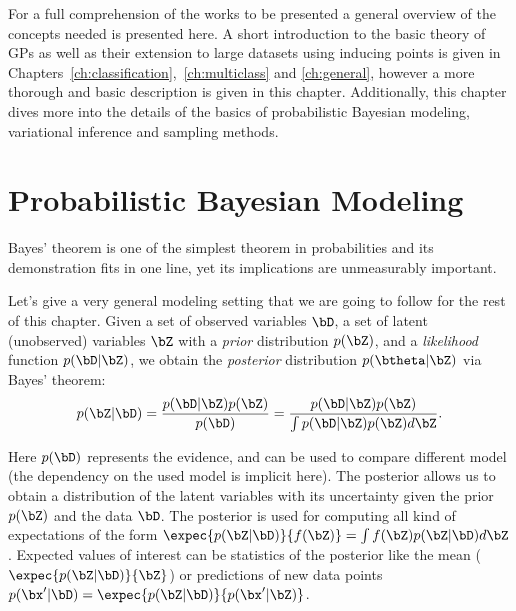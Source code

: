 


\graphicspath{{2_background/figures/}}

For a full comprehension of the works to be presented a general overview of the concepts needed is presented here.
A short introduction to the basic theory of \acl{GPs} as well as their extension to large datasets using inducing points \cite{Titsias2009} is given in Chapters~\ref{ch:classification},~\ref{ch:multiclass} and \ref{ch:general}, however a more thorough and basic description is given in this chapter.
Additionally, this chapter dives more into the details of the basics of probabilistic Bayesian modeling, variational inference and sampling methods.


\section{Probabilistic Bayesian Modeling}

\label{sec:prob_bayes}

Bayes' theorem is one of the simplest theorem in probabilities and its demonstration fits in one line, yet its implications are unmeasurably important.

Let's give a very general modeling setting that we are going to follow for the rest of this chapter.
Given a set of observed variables $\bD$, a set of latent (unobserved) variables $\bZ$ with a \textit{prior} distribution $p(\bZ)$, and a \textit{likelihood} function $p(\bD|\bZ)$, we obtain the \textit{posterior} distribution $p(\btheta|\bZ)$ via Bayes' theorem:
\begin{align}
p(\bZ|\bD) = \frac{p(\bD|\bZ)p(\bZ)}{p(\bD)} = \frac{p(\bD|\bZ)p(\bZ)}{\int p(\bD|\bZ)p(\bZ)d\bZ}.
\label{eq:bayes}
\end{align}

Here $p(\bD)$ represents the evidence, and can be used to compare different model (the dependency on the used model is implicit here).
The posterior allows us to obtain a distribution of the latent variables with its uncertainty given the prior $p(\bZ)$ and the data $\bD$.
The posterior is used for computing all kind of expectations of the form $\expec{p(\bZ|\bD)}{f(\bZ)} = \int f(\bZ)p(\bZ|\bD)d\bZ$.
Expected values of interest can be statistics of the posterior like the mean ($\expec{p(\bZ|\bD)}{\bZ}$) or predictions of new data points $p(\bx'|\bD) = \expec{p(\bZ|\bD)}{p(\bx'|\bZ)}$.

